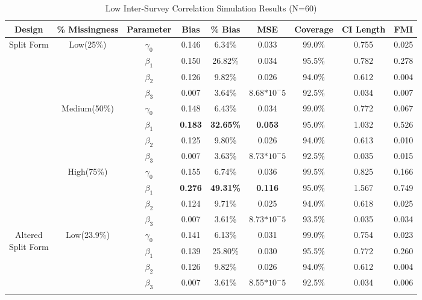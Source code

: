 \documentclass{svjour3}\usepackage[]{graphicx}\usepackage[]{color}
\begin{document}
\begin{table}[p]
	\centering
	\caption{Low Inter-Survey Correlation Simulation Results (N=60)}
	\label{tab:table5}
	\setlength{\tabcolsep}{0.1cm}
	\hspace*{-1cm}
	\begin{tabular}{c|c|c|cccccc}
		\toprule
		Design & \% Missingness & Parameter & Bias & \% Bias & MSE & Coverage & CI Length & FMI \\
		\midrule
		\multirow{12}{*}{Split Form}
		& \multirow{4}{*}{Low(25\%)}
		& $\gamma_0$ & 0.146 & 6.34\% & 0.033 & 99.0\% & 0.755 & 0.025 \\
		&& $\beta_1$ & 0.150 & 26.82\% & 0.034 & 95.5\% & 0.782 & 0.278 \\
		&& $\beta_2$ & 0.126 & 9.82\% & 0.026 & 94.0\% & 0.612 & 0.004 \\
		&& $\beta_3$ & 0.007 & 3.64\% & 8.68$*10^-5$ & 92.5\% & 0.034 & 0.007 \\ \cline{2-9} \noalign{\smallskip}
		&\multirow{4}{*}{Medium(50\%)}
		& $\gamma_0$ & 0.148 & 6.43\% & 0.034 & 99.0\% & 0.772 & 0.067 \\
		&& $\beta_1$ & \textbf{0.183} & \textbf{32.65\%} & \textbf{0.053} & 95.0\% & 1.032 & 0.526 \\
		&& $\beta_2$ & 0.125 & 9.80\% & 0.026 & 94.0\% & 0.613 & 0.010 \\
		&& $\beta_3$ & 0.007 & 3.63\% & 8.73$*10^-5$ & 92.5\% & 0.035 & 0.015 \\ \cline{2-9} \noalign{\smallskip}
		& \multirow{4}{*}{High(75\%)}
		& $\gamma_0$ & 0.155 & 6.74\% & 0.036 & 99.5\% & 0.825 & 0.166 \\
		&& $\beta_1$ & \textbf{0.276} & \textbf{49.31\%} & \textbf{0.116} & 95.0\% & 1.567 & 0.749 \\
		&& $\beta_2$ & 0.124 & 9.71\% & 0.025 & 94.0\% & 0.618 & 0.025 \\
		&& $\beta_3$ & 0.007 & 3.61\% & 8.73$*10^-5$ & 93.5\% & 0.035 & 0.034 \\
		\midrule
		\midrule
		\multirow{12}{*}{\parbox{1.75cm}{Altered \\ Split Form}}
		& \multirow{4}{*}{Low(23.9\%)}
		& $\gamma_0$ & 0.141 & 6.13\% & 0.031 & 99.0\% & 0.754 & 0.023 \\
		&& $\beta_1$ & 0.139 & 25.80\% & 0.030 & 95.5\% & 0.772 & 0.260 \\
		&& $\beta_2$ & 0.126 & 9.82\% & 0.026 & 94.0\% & 0.612 & 0.004 \\
		&& $\beta_3$ & 0.007 & 3.61\% & 8.55$*10^-5$ & 92.5\% & 0.034 & 0.006 \\ \cline{2-9} \noalign{\smallskip}

\end{tabular}
\end{table}
\end{document}
